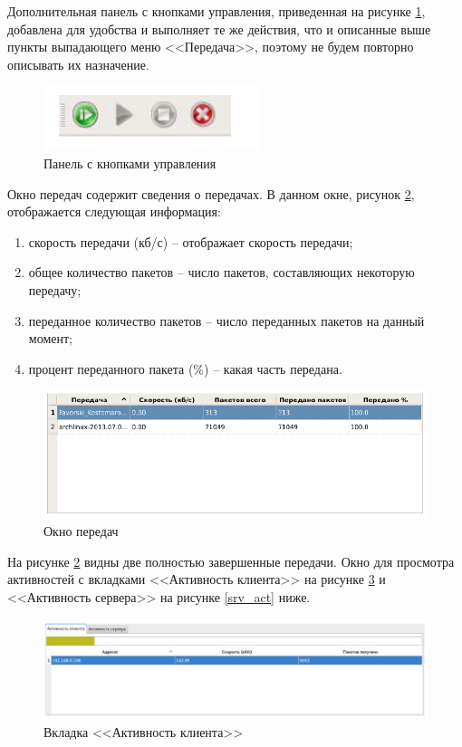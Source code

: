 Дополнительная панель с кнопками управления, приведенная на рисунке \ref{buttons},
добавлена для удобства и выполняет те же действия, что и описанные выше
пункты выпадающего меню <<Передача>>, поэтому не будем повторно
описывать их назначение.

\begin{figure}[!hbt]
    \centering
    \includegraphics{buttons}
    \caption{Панель с кнопками управления}\label{buttons}
\end{figure}

Окно передач содержит сведения о передачах. В данном окне, рисунок \ref{transmitions},
отображается следующая информация:
\begin{enumerate}
    \item скорость передачи (кб/с) -- отображает скорость передачи;
    \item общее количество пакетов -- число пакетов, составляющих некоторую
        передачу;
    \item переданное количество пакетов -- число переданных пакетов на данный
        момент;
    \item процент переданного пакета (\%) -- какая часть передана.
\end{enumerate}

\begin{figure}[!hbt]
    \centering
    \includegraphics[width=\textwidth]{transmitions}
    \caption{Окно передач}\label{transmitions}
\end{figure}

На рисунке \ref{transmitions} видны две полностью завершенные передачи.
Окно для просмотра активностей с вкладками <<Активность клиента>> на
рисунке \ref{cli_act} и <<Активность сервера>> на рисунке \ref{srv_act} ниже.

\begin{figure}[!hbt]
    \centering
    \includegraphics[width=\textwidth]{cli}
    \caption{Вкладка <<Активность клиента>>}\label{cli_act}
\end{figure}

